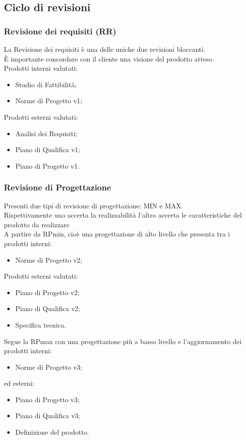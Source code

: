\documentclass[12pt,a4paper,titlepage]{article}
\begin{document}
\normalsize
\subsection{Ciclo di revisioni}
\subsubsection{Revisione dei requisiti (RR)}
La Revisione dei requisiti è una delle uniche due revisioni bloccanti.\\
È importante concordare con il cliente una visione del prodotto atteso.\\
Prodotti interni valutati:
\begin{itemize}
	\item Studio di Fattibilità;
	\item Norme di Progetto v1;
\end{itemize}
Prodotti esterni valutati:
\begin{itemize}
	\item Analisi dei Requisiti;
	\item Piano di Qualifica v1;
	\item Piano di Progetto v1.
\end{itemize}

\subsubsection{Revisione di Progettazione}
Presenti due tipi di revisione di progettazione: MIN e MAX. \\
Rispettivamente uno accerta la realizzabilità l'altro accerta le caratteristiche del prodotto da realizzare\\
A partire da RPmin, cioè una progettazione di alto livello che presenta tra i prodotti interni:
\begin{itemize}
	\item Norme di Progetto v2;
\end{itemize}
Prodotti esterni valutati: 
\begin{itemize}
	\item Piano di Progetto v2;
	\item Piano di Qualifica v2;
	\item Specifica tecnica.
\end{itemize}
Segue la RPmax con una progettazione più a basso livello e l'aggiornamento dei prodotti interni:
\begin{itemize}
	\item Norme di Progetto v3;
\end{itemize}
ed esterni:
\begin{itemize}
	\item Piano di Progetto v3;
	\item Piano di Qualifica v3;
	\item Definizione del prodotto.
\end{itemize}
\end{document}
